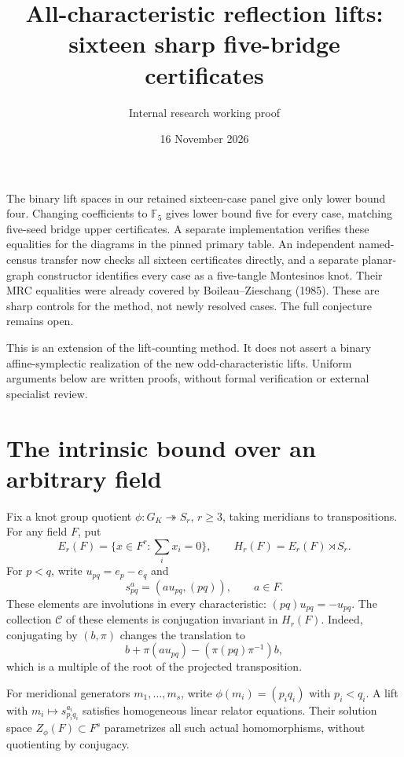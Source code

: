 \documentclass[11pt]{article}
\title{All-characteristic reflection lifts:\\sixteen sharp five-bridge certificates}
\author{Internal research working proof}
\date{16 November 2026}
\newcommand{\F}{\mathbb F}
\begin{document}
\maketitle

The binary lift spaces in our retained sixteen-case panel give only
lower bound four. Changing coefficients to $\F_5$ gives lower bound five
for every case, matching five-seed bridge upper certificates. A separate
implementation verifies these equalities for the diagrams in the pinned
primary table. An independent named-census transfer now checks all sixteen
certificates directly, and a separate planar-graph constructor identifies
every case as a five-tangle Montesinos knot. Their MRC equalities were
already covered by Boileau--Zieschang (1985). These are sharp controls for
the method, not newly resolved cases. The full conjecture remains open.

This is an extension of the lift-counting method. It does not assert a
binary affine-symplectic realization of the new odd-characteristic lifts.
Uniform arguments below are written proofs, without formal verification
or external specialist review.

\section{The intrinsic bound over an arbitrary field}

Fix a knot group quotient $\phi:G_K\twoheadrightarrow S_r$, $r\ge3$,
taking meridians to transpositions. For any field $F$, put
\[
 E_r(F)=\{x\in F^r:\textstyle\sum_i x_i=0\},\qquad
 H_r(F)=E_r(F)\rtimes S_r.
\]
For $p<q$, write $u_{pq}=e_p-e_q$ and
\[
 s_{pq}^a=(a u_{pq},(pq)),\qquad a\in F.
\]
These elements are involutions in every characteristic: $(pq)u_{pq}=-u_{pq}$.
The collection $\mathcal C$ of these elements is conjugation invariant
in $H_r(F)$. Indeed, conjugating by $(b,\pi)$ changes the translation to
\[
 b+\pi(a u_{pq})-(\pi(pq)\pi^{-1})b,
\]
which is a multiple of the root of the projected transposition.

For meridional generators $m_1,\ldots,m_s$, write
$\phi(m_i)=(p_iq_i)$ with $p_i<q_i$. A lift with
$m_i\mapsto s_{p_iq_i}^{a_i}$ satisfies homogeneous linear relator
equations. Their solution space $Z_\phi(F)\subset F^s$ parametrizes all
such actual homomorphisms, without quotienting by conjugacy.
\end{document}
